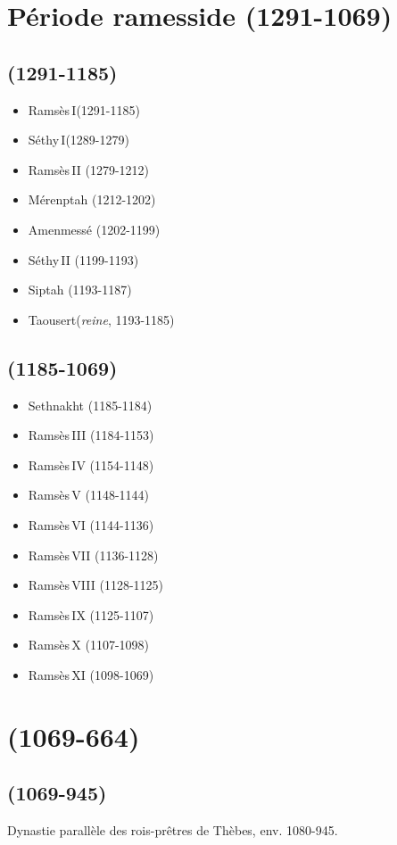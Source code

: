 {{{{\section*{Période ramesside (1291-1069)}

\subsection*{ (1291-1185)}
  \begin{itemize}
    \item Ramsès\,I\ier (1291-1185)
    \item Séthy\,I\ier (1289-1279)
    \item Ramsès\,II (1279-1212)
    \item Mérenptah (1212-1202)
    \item Amenmessé (1202-1199)
    \item Séthy\,II (1199-1193)
    \item Siptah (1193-1187)
    \item Taousert(\emph{reine}, 1193-1185)
  \end{itemize}
\subsection*{ (1185-1069)}
  \begin{itemize}
    \item Sethnakht (1185-1184)
    \item Ramsès\,III (1184-1153)
    \item Ramsès\,IV (1154-1148)
    \item Ramsès\,V (1148-1144)
    \item Ramsès\,VI (1144-1136)
    \item Ramsès\,VII (1136-1128)
    \item Ramsès\,VIII (1128-1125)
    \item Ramsès\,IX (1125-1107)
    \item Ramsès\,X (1107-1098)
    \item Ramsès\,XI (1098-1069)
  \end{itemize}

\section*{\TPI (1069-664)}

\subsection*{ (1069-945)}
  Dynastie parallèle des \og rois-prêtres \fg de Thèbes, 
  env. 1080-945.
}}}}

